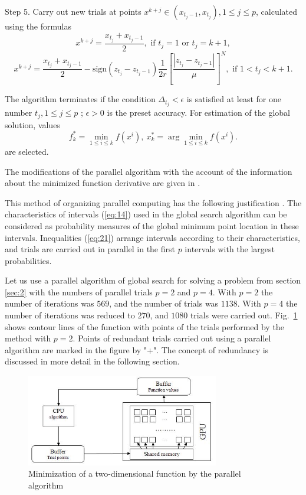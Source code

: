 \documentclass[smallcondensed]{svjour3}     %
\begin{document}
Step 5. Carry out new trials at points $x^{k+j}\in(x_{t_j-1},x_{t_j}), 1\leq j\leq p$, calculated using the formulas
\[
x^{k+j} = \frac{x_{t_j}+x_{t_j-1}}{2}, \textrm{ if } t_j=1 \textrm{ or } t_j=k+1,
\]
\[
x^{k+j} = \frac{x_{t_j}+x_{t_j-1}}{2} - \mathrm{sign}(z_{t_j}-z_{t_j-1})\frac{1}{2r}\left[\frac{\left|z_{t_j}-z_{t_j-1}\right|}{\mu}\right]^N, \textrm{ if } 1<t_j<k+1.
\]

The algorithm terminates if the condition $\Delta_{t_j}<\epsilon$ is satisfied at least for one number $t_j, 1 \leq j \leq p$ ; $\epsilon>0$ is the preset accuracy.  For estimation of the global solution, values
\[
f_k^\ast=\min_{1\leq i \leq k}f(x^i), \ x_k^\ast=\arg \min_{1\leq i \leq k}f(x^i).
\]
are selected.

The modifications of the parallel algorithm with the account of the information about the minimized function derivative are given in \cite{RefGergel1999}.

This method of organizing parallel computing has the following justification \cite{RefStrongin2000,RefGrishagin1997}. The characteristics of intervals (\ref{eq:14}) used in the global search algorithm can be considered as probability measures of the global minimum point location in these intervals. Inequalities (\ref{eq:21}) arrange intervals according to their characteristics, and trials are carried out in parallel in the first $p$ intervals with the largest probabilities.

Let us use a parallel algorithm of global search for solving a problem from section \ref{sec:2} with the numbers of parallel trials $p=2$ and $p=4$. With $p=2$ the number of iterations was $569$, and the number of trials was $1138$. With $p=4$ the number of iterations was reduced to $270$, and $1080$ trials were carried out. Fig.~\ref{fig:2} shows contour lines of the function with points of the trials performed by the method with $p=2$. Points of redundant trials carried out using a parallel algorithm are marked in the figure by "+". The concept of redundancy is discussed in more detail in the following section.
\begin{figure}
	\center
  \includegraphics[width=0.75\textwidth]{fig3.jpg} 
  \caption{Minimization of a two-dimensional function by the parallel algorithm}
  \label{fig:2}
\end{figure}
\end{document}
